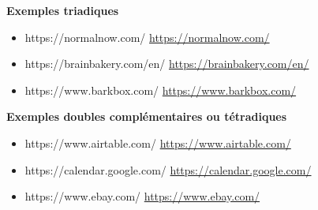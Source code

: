 \textbf{Exemples triadiques}

\begin{itemize}
\item https://normalnow.com/ \url{https://normalnow.com/}
\item https://brainbakery.com/en/ \url{https://brainbakery.com/en/}
\item https://www.barkbox.com/ \url{https://www.barkbox.com/}
\end{itemize}

\textbf{Exemples doubles complémentaires ou tétradiques}

\begin{itemize}
\item https://www.airtable.com/ \url{https://www.airtable.com/}
\item https://calendar.google.com/ \url{https://calendar.google.com/}
\item https://www.ebay.com/ \url{https://www.ebay.com/}
\end{itemize}


